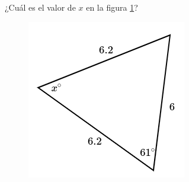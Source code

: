¿Cuál es el valor de $x$ en la figura \ref{fig:findangle04}?

\begin{minipage}[t][][t]{0.35\textwidth}
    \begin{figure}[H]
        \centering
        \includegraphics[width=0.9\linewidth]{../images/findangle04.png}
        \caption{}
        \label{fig:findangle04}
    \end{figure}
\end{minipage}\hfill
